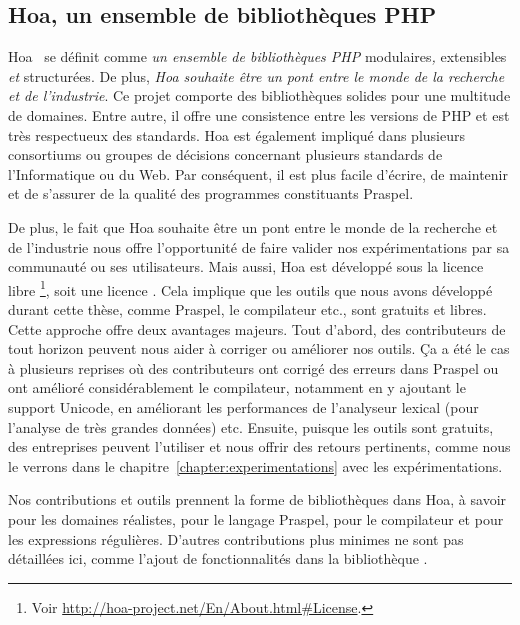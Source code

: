 \subsection{Hoa, un ensemble de bibliothèques PHP}
\label{subsection:tools:hoa}

Hoa~ se définit comme {\em un ensemble de bibliothèques PHP}
modulaires{\em , } extensibles {\em et } structurées. De plus, {\em Hoa souhaite
être un pont entre le monde de la recherche et de l'industrie}. Ce projet
comporte des bibliothèques solides pour une multitude de domaines. Entre autre,
il offre une consistence entre les versions de PHP et est très respectueux des
standards. Hoa est également impliqué dans plusieurs consortiums ou groupes de
décisions concernant plusieurs standards de l'Informatique ou du Web. Par
conséquent, il est plus facile d'écrire, de maintenir et de s'assurer de la
qualité des programmes constituants Praspel.

De plus, le fait que Hoa souhaite être un pont entre le monde de la recherche et
de l'industrie nous offre l'opportunité de faire valider nos expérimentations
par sa communauté ou ses utilisateurs. Mais aussi, Hoa est développé sous la
licence libre \footnote{Voir
\url{http://hoa-project.net/En/About.html\#License}.}, soit une licence
. Cela implique que les outils que nous avons développé
durant cette thèse, comme Praspel, le compilateur etc., sont gratuits et libres.
Cette approche offre deux avantages majeurs. Tout d'abord, des contributeurs de
tout horizon peuvent nous aider à corriger ou améliorer nos outils. Ça a été le
cas à plusieurs reprises où des contributeurs ont corrigé des erreurs dans
Praspel ou ont amélioré considérablement le compilateur, notamment en y ajoutant
le support Unicode, en améliorant les performances de l'analyseur lexical (pour
l'analyse de très grandes données) etc. Ensuite, puisque les outils sont
gratuits, des entreprises peuvent l'utiliser et nous offrir des retours
pertinents, comme nous le verrons dans le
chapitre~\ref{chapter:experimentations} avec les expérimentations.

Nos contributions et outils prennent la forme de bibliothèques dans Hoa, à
savoir  pour les domaines réalistes,
 pour le langage Praspel, 
pour le compilateur et  pour les expressions régulières.
D'autres contributions plus minimes ne sont pas détaillées ici, comme l'ajout de
fonctionnalités dans la bibliothèque .

